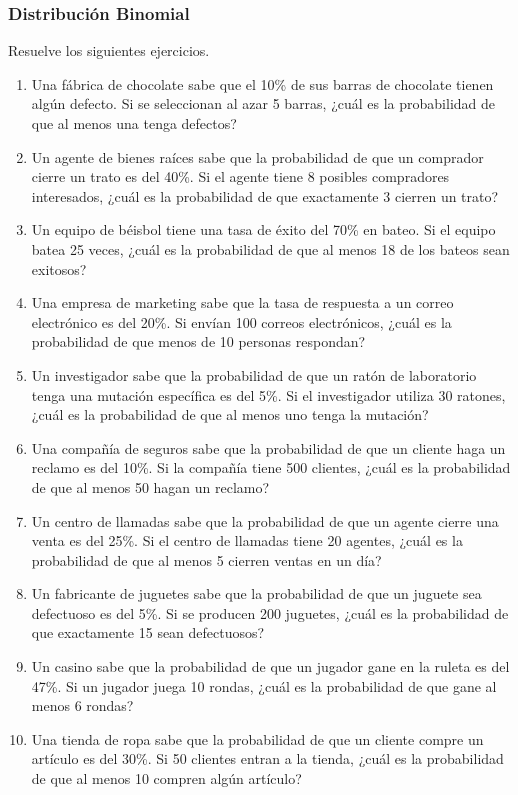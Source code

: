 \subsubsection{Distribución Binomial}
\begin{Ejer}
Resuelve los siguientes ejercicios.

\begin{enumerate}
    \item Una fábrica de chocolate sabe que el 10\% de sus barras de chocolate tienen algún defecto. Si se seleccionan al azar 5 barras, ¿cuál es la probabilidad de que al menos una tenga defectos?
    \item Un agente de bienes raíces sabe que la probabilidad de que un comprador cierre un trato es del 40\%. Si el agente tiene 8 posibles compradores interesados, ¿cuál es la probabilidad de que exactamente 3 cierren un trato?
    \item Un equipo de béisbol tiene una tasa de éxito del 70\% en bateo. Si el equipo batea 25 veces, ¿cuál es la probabilidad de que al menos 18 de los bateos sean exitosos?
    \item Una empresa de marketing sabe que la tasa de respuesta a un correo electrónico es del 20\%. Si envían 100 correos electrónicos, ¿cuál es la probabilidad de que menos de 10 personas respondan?
    \item Un investigador sabe que la probabilidad de que un ratón de laboratorio tenga una mutación específica es del 5\%. Si el investigador utiliza 30 ratones, ¿cuál es la probabilidad de que al menos uno tenga la mutación?
    \item Una compañía de seguros sabe que la probabilidad de que un cliente haga un reclamo es del 10\%. Si la compañía tiene 500 clientes, ¿cuál es la probabilidad de que al menos 50 hagan un reclamo?
    \item Un centro de llamadas sabe que la probabilidad de que un agente cierre una venta es del 25\%. Si el centro de llamadas tiene 20 agentes, ¿cuál es la probabilidad de que al menos 5 cierren ventas en un día?
    \item Un fabricante de juguetes sabe que la probabilidad de que un juguete sea defectuoso es del 5\%. Si se producen 200 juguetes, ¿cuál es la probabilidad de que exactamente 15 sean defectuosos?
    \item Un casino sabe que la probabilidad de que un jugador gane en la ruleta es del 47\%. Si un jugador juega 10 rondas, ¿cuál es la probabilidad de que gane al menos 6 rondas?
    \item Una tienda de ropa sabe que la probabilidad de que un cliente compre un artículo es del 30\%. Si 50 clientes entran a la tienda, ¿cuál es la probabilidad de que al menos 10 compren algún artículo?
\end{enumerate}
\end{Ejer}

